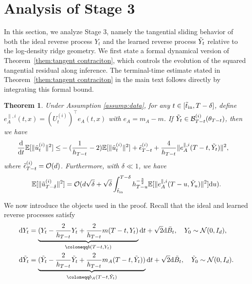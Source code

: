 \documentclass[11pt]{article}
\newcommand{\mb}{\mathbb}
\newcommand{\dee}{\mathrm{d}}
\newcommand{\mc}{\mathcal}
\newtheorem{theorem}{Theorem}[section]
\begin{document}
\section{Analysis of Stage 3}\label{append:stage 3} In this section, we analyze Stage 3, namely the tangential sliding behavior of both the ideal reverse process $Y_t$ and the learned reverse process $\Tilde{Y}_t$ relative to the log-density ridge geometry. We first state a formal dynamical version of Theorem~\ref{them:tangent contraciton}, which controls the evolution of the squared tangential residual along inference. The terminal-time estimate stated in Theorem~\ref{them:tangent contraciton} in the main text follows directly by integrating this formal bound.
\begin{theorem}\label{thm:formal tangent contraciton} Under Assumption \ref{assump:data}, for any $t\in [\Tilde{t}_{\mathrm{in}},T-\delta]$, define  $e_A^{\parallel,i}(t,x)=(U_{t}^{(i)})^\intercal e_A(t,x)$ with $e_A=m_A-m$. If $\Tilde{Y}_t\in \mc{B}_{T-t}^{(i)}(\theta_{T-t})$,  then we have
{
    \begin{align*}
     \frac{\dee}{\dee t} \mb{E}[\| \Tilde{u}_t^{(i)} \|^2]  \le &-(\frac{1}{h_{T-t}}-2)\mb{E}[\| \Tilde{u}_t^{(i)} \|^2]  + \Tilde{\epsilon}_{T-t}^{(i)}+ \frac{4}{h_{T-t}}\|e_A^{\parallel,i}(T-t,\Tilde{Y}_t) \|^2,
\end{align*}}
where $\Tilde{\epsilon}_{T-t}^{(i)}=\mc{O}(d)$.
    Furthermore, with $\delta\ll 1$, we have
    {
\begin{align*}
     \mb{E}[\| \Tilde{u}_{T-\delta}^{(i)} \|^2]= \mc{O}( d\sqrt{\delta} + \sqrt{\delta} \int_{\Tilde{t}_{\mathrm{in}}}^{T-\delta}  h_{T-u}^{-\frac{3}{2}}{\mb{E}[\|e_A^{\parallel,i}(T-u,\Tilde{Y}_{u}) \|^2]} \dee u  ).
\end{align*}}
\end{theorem}
We now introduce the objects used in the proof. Recall that the ideal and learned reverse processes satisfy
\begin{align*}
    \dee Y_t &= \underbrace{(Y_t - \frac{2}{h_{T-t}}Y_t + \frac{2}{h_{T-t}} m(T-t,Y_t)}_{\coloneqq b(T-t,Y_t)} \dee t +\sqrt{2} \dee \Bar{B}_t,  \quad Y_0\sim \mc{N}(0,I_d), \\
    \dee \Tilde{Y}_t &= \underbrace{(\Tilde{Y}_t -\frac{2}{h_{T-t}}\Tilde{Y}_t + \frac{2}{h_{T-t}} m_A(T-t,\Tilde{Y}_t))}_{\coloneqq b_A(T-t,\Tilde{Y}_t)} \dee t +\sqrt{2} \dee \Tilde{B}_t,  \quad \Tilde{Y}_0\sim \mc{N}(0,I_d).
\end{align*} 
\end{document}
